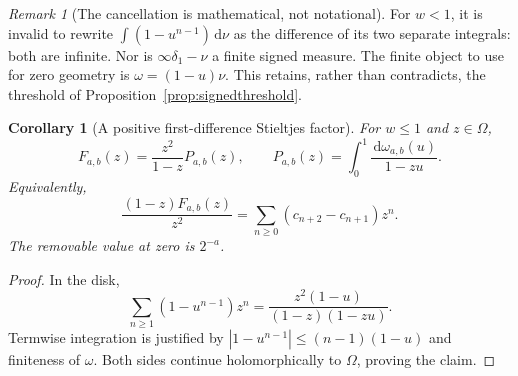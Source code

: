 \documentclass[11pt]{article}
\numberwithin{equation}{section}
\newtheorem{corollary}[theorem]{Corollary}
\theoremstyle{definition}
\theoremstyle{remark}
\newtheorem{remark}[theorem]{Remark}
\newcommand{\dd}{\,\mathrm d}
\newcommand{\cut}{\Omega}
\begin{document}
\begin{remark}[The cancellation is mathematical, not notational]
For $w<1$, it is invalid to rewrite
$\int(1-u^{n-1})\dd\nu$ as the difference of its two separate integrals:
both are infinite. Nor is $\infty\delta_1-\nu$ a finite signed measure.
The finite object to use for zero geometry is $\omega=(1-u)\nu$.
This retains, rather than contradicts, the threshold of
Proposition~\ref{prop:signedthreshold}.
\end{remark}

\begin{corollary}[A positive first-difference Stieltjes factor]
\label{cor:factor}
For $w\le1$ and $z\in\cut$,
\begin{equation}\label{eq:factor}
 F_{a,b}(z)=\frac{z^2}{1-z}P_{a,b}(z),\qquad
 P_{a,b}(z)=\int_0^1\frac{\dd\omega_{a,b}(u)}{1-zu}.
\end{equation}
Equivalently,
\begin{equation}\label{eq:differencegf}
 \frac{(1-z)F_{a,b}(z)}{z^2}
 =\sum_{n\ge0}(c_{n+2}-c_{n+1})z^n.
\end{equation}
The removable value at zero is $2^{-a}$.
\end{corollary}
\begin{proof}
In the disk,
\[
 \sum_{n\ge1}(1-u^{n-1})z^n
 =\frac{z^2(1-u)}{(1-z)(1-zu)}.
\]
Termwise integration is justified by
$|1-u^{n-1}|\le(n-1)(1-u)$ and finiteness of $\omega$.
Both sides continue holomorphically to $\cut$, proving the claim.
\end{proof}
\end{document}
